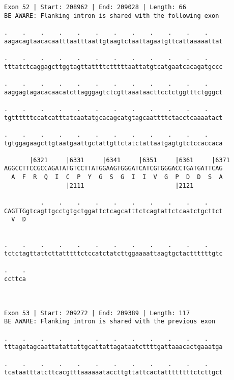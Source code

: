 \documentclass{article}
\begin{document}
\begin{Verbatim}
Exon 52 | Start: 208962 | End: 209028 | Length: 66
BE AWARE: Flanking intron is shared with the following exon
 
.    .    .    .    .    .    .    .    .    .    .    .    
aagacagtaacacaatttaatttaattgtaagtctaattagaatgttcattaaaaattat
                                                            
.    .    .    .    .    .    .    .    .    .    .    .    
tttatctcaggagcttggtagttattttctttttaattatgtcatgaatcacagatgccc
                                                            
.    .    .    .    .    .    .    .    .    .    .    .    
aaggagtagacacaacatcttagggagtctcgttaaataacttcctctggtttctgggct
                                                            
.    .    .    .    .    .    .    .    .    .    .    .    
tgttttttccatcatttatcaatatgcacagcatgtagcaattttctacctcaaaatact
                                                            
.    .    .    .    .    .    .    .    .    .    .    .    
tgtggagaagcttgtaatgaattgctattgttctatctattaatgagtgtctccaccaca
                                                            
       |6321     |6331     |6341     |6351     |6361     |6371
AGGCCTTCCGCCAGATATGTCCTTATGGAAGTGGGATCATCGTGGGACCTGATGATTCAG
  A  F  R  Q  I  C  P  Y  G  S  G  I  I  V  G  P  D  D  S  A
                 |2111                         |2121        
  
          .    .    .    .    .    .    .    .    .    .    
CAGTTGgtcagttgcctgtgctggattctcagcatttctcagtattctcaatctgcttct
  V  D                                                      
                                                            
  
.    .    .    .    .    .    .    .    .    .    .    .    
tctctagttattcttatttttctccatctatcttggaaaattaagtgctacttttttgtc
                                                            
.    .
ccttca
      
      
 
Exon 53 | Start: 209272 | End: 209389 | Length: 117
BE AWARE: Flanking intron is shared with the previous exon
 
.    .    .    .    .    .    .    .    .    .    .    .    
tttagatagcaattatattattgcattattagataatcttttgattaaacactgaaatga
                                                            
.    .    .    .    .    .    .    .    .    .    .    .    
tcataatttatcttcacgtttaaaaaataccttgttattcactattttttttctcttgct
                                                            

\end{Verbatim}
\end{document}
